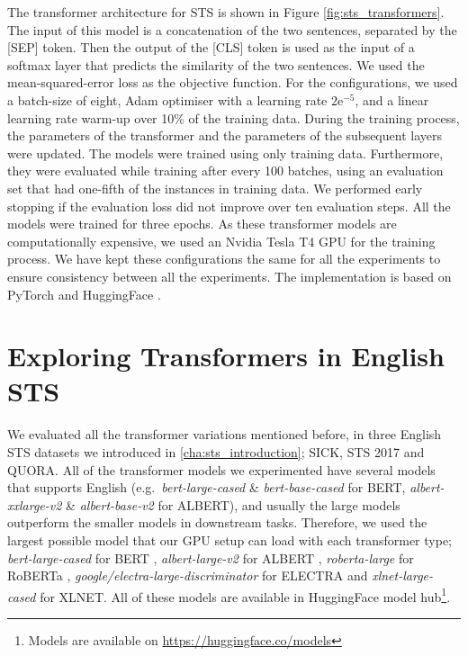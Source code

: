 The transformer architecture for STS is shown in Figure \ref{fig:sts_transformers}. The input of this model is a concatenation of the two sentences, separated by the \textsc{[SEP]} token. Then the output of the \textsc{[CLS]} token is used as the input of a softmax layer that predicts the similarity of the two sentences. We used the mean-squared-error loss as the objective function. For the configurations, we used a batch-size of eight, Adam optimiser with a learning rate $2\mathrm{e}^{-5}$, and a linear learning rate warm-up over 10\% of the training data. During the training process, the parameters of the transformer and the parameters of the subsequent layers were updated. The models were trained using only training data. Furthermore, they were evaluated while training after every 100 batches, using an evaluation set that had one-fifth of the instances in training data. We performed early stopping if the evaluation loss did not improve over ten evaluation steps. All the models were trained for three epochs. As these transformer models are computationally expensive, we used an Nvidia Tesla T4 GPU for the training process. We have kept these configurations the same for all the experiments to ensure consistency between all the experiments. The implementation is based on PyTorch \autocite{NEURIPS2019_9015} and HuggingFace \autocite{wolf-etal-2020-transformers}.


\section{Exploring Transformers in English STS}
\label{sec:transformer_english}
We evaluated all the transformer variations mentioned before, in three English STS datasets we introduced in \ref{cha:sts_introduction}; SICK, STS 2017 and QUORA. All of the transformer models we experimented have several models that supports English (e.g.\ \textit{bert-large-cased} \& \textit{bert-base-cased} for BERT, \textit{albert-xxlarge-v2} \& \textit{albert-base-v2} for ALBERT), and usually the large models outperform the smaller models in downstream tasks. Therefore, we used the largest possible model that our GPU setup can load with each transformer type; \textit{bert-large-cased} for BERT \autocite{devlin-etal-2019-bert}, \textit{albert-large-v2} for ALBERT \autocite{Lan2020ALBERT}, \textit{roberta-large} for RoBERTa \autocite{liu2019roberta}, \textit{google/electra-large-discriminator} for ELECTRA \autocite{Clark2020ELECTRA} and \textit{xlnet-large-cased}  \autocite{yang2019xlnet} for XLNET. All of these models are available in HuggingFace \autocite{wolf-etal-2020-transformers} model hub\footnote{Models are available on \url{https://huggingface.co/models}}.

